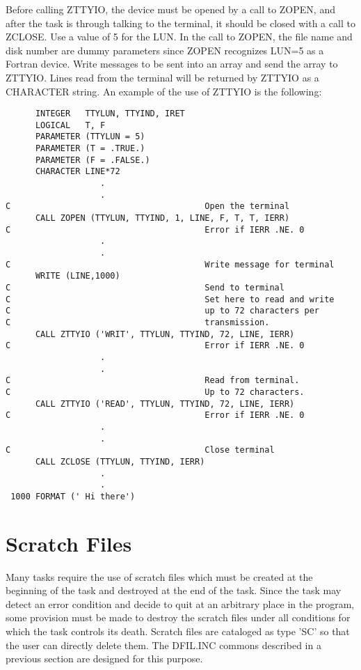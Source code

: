  Before calling ZTTYIO, the device must be opened by a call to ZOPEN,
and after the task is through talking to the terminal, it should be
closed with a call to ZCLOSE.  Use a value of 5 for the LUN. In the
call to ZOPEN, the file name and disk number are  dummy parameters
since ZOPEN recognizes LUN=5 as a Fortran device.  Write messages to
be sent into an array and send the array to ZTTYIO.  Lines read from
the terminal will be returned by ZTTYIO as a CHARACTER
string. An example of the use of ZTTYIO is the following:
\begin{verbatim}
      INTEGER   TTYLUN, TTYIND, IRET
      LOGICAL   T, F
      PARAMETER (TTYLUN = 5)
      PARAMETER (T = .TRUE.)
      PARAMETER (F = .FALSE.)
      CHARACTER LINE*72
                   .
                   .
C                                       Open the terminal
      CALL ZOPEN (TTYLUN, TTYIND, 1, LINE, F, T, T, IERR)
C                                       Error if IERR .NE. 0
                   .
                   .
C                                       Write message for terminal
      WRITE (LINE,1000)
C                                       Send to terminal
C                                       Set here to read and write
C                                       up to 72 characters per
C                                       transmission.
      CALL ZTTYIO ('WRIT', TTYLUN, TTYIND, 72, LINE, IERR)
C                                       Error if IERR .NE. 0
                   .
                   .
C                                       Read from terminal.
C                                       Up to 72 characters.
      CALL ZTTYIO ('READ', TTYLUN, TTYIND, 72, LINE, IERR)
C                                       Error if IERR .NE. 0
                   .
                   .
C                                       Close terminal
      CALL ZCLOSE (TTYLUN, TTYIND, IERR)
                   .
                   .
 1000 FORMAT (' Hi there')

\end{verbatim}

\section{Scratch Files}
Many tasks require the use of scratch files which must be created at
the beginning of the task and destroyed at the end of the task. Since
the task may detect an error condition and decide to quit at an
arbitrary place in the program, some provision must be made to destroy
the scratch files under all conditions for which the task controls its
death.  Scratch files are cataloged as type 'SC' so that the user
can directly delete them. The DFIL.INC commons described in a previous
section are designed for this purpose.

